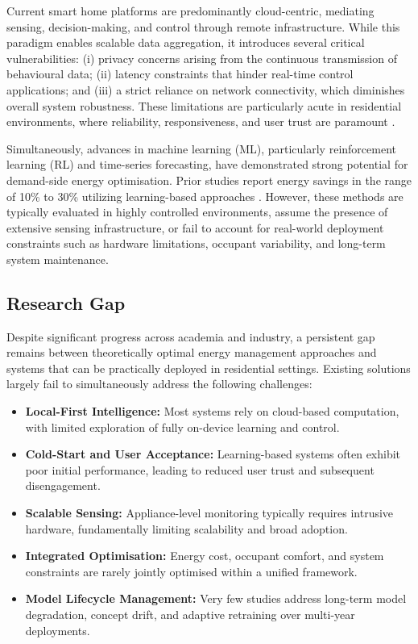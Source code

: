 \documentclass[11pt,a4paper]{article}
\begin{document}
Current smart home platforms are predominantly cloud-centric, mediating sensing, decision-making, and control through remote infrastructure. While this paradigm enables scalable data aggregation, it introduces several critical vulnerabilities: (i) privacy concerns arising from the continuous transmission of behavioural data; (ii) latency constraints that hinder real-time control applications; and (iii) a strict reliance on network connectivity, which diminishes overall system robustness. These limitations are particularly acute in residential environments, where reliability, responsiveness, and user trust are paramount \cite{zipperer2013electric}.

Simultaneously, advances in machine learning (ML), particularly reinforcement learning (RL) and time-series forecasting, have demonstrated strong potential for demand-side energy optimisation. Prior studies report energy savings in the range of 10\% to 30\% utilizing learning-based approaches \cite{vazquez2019reinforcement, wang2020reinforcement}. However, these methods are typically evaluated in highly controlled environments, assume the presence of extensive sensing infrastructure, or fail to account for real-world deployment constraints such as hardware limitations, occupant variability, and long-term system maintenance.

\subsection{Research Gap}
Despite significant progress across academia and industry, a persistent gap remains between theoretically optimal energy management approaches and systems that can be practically deployed in residential settings. Existing solutions largely fail to simultaneously address the following challenges:

\begin{itemize}[leftmargin=*]
    \item \textbf{Local-First Intelligence:} Most systems rely on cloud-based computation, with limited exploration of fully on-device learning and control.
    \item \textbf{Cold-Start and User Acceptance:} Learning-based systems often exhibit poor initial performance, leading to reduced user trust and subsequent disengagement.
    \item \textbf{Scalable Sensing:} Appliance-level monitoring typically requires intrusive hardware, fundamentally limiting scalability and broad adoption.
    \item \textbf{Integrated Optimisation:} Energy cost, occupant comfort, and system constraints are rarely jointly optimised within a unified framework.
    \item \textbf{Model Lifecycle Management:} Very few studies address long-term model degradation, concept drift, and adaptive retraining over multi-year deployments.
\end{itemize}
\end{document}
